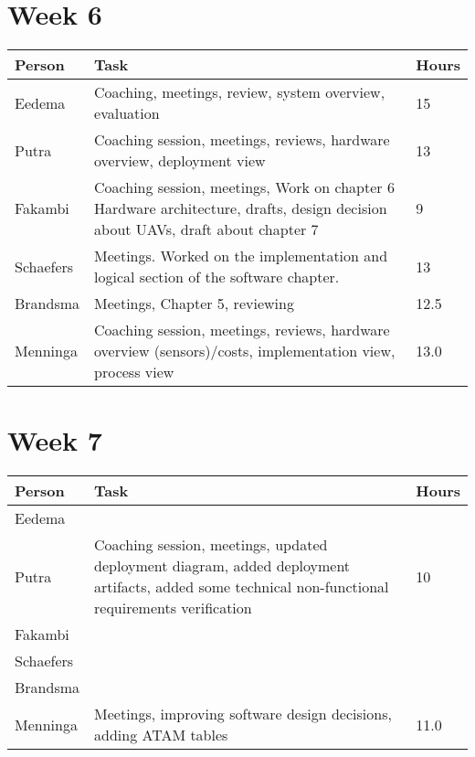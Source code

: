 \section{Week 6}
\begin{tabular}{p{} p{} p{}}
	\textbf{Person} & \textbf{Task}                                                                                                                  & \textbf{Hours} \\ \midrule
	Eedema          & Coaching, meetings, review, system overview, evaluation                                                                        & 15             \\ \midrule
	Putra           & Coaching session, meetings, reviews, hardware overview, deployment view                                                        & 13             \\ \midrule
	Fakambi         & Coaching session, meetings, Work on chapter 6 Hardware architecture, drafts, design decision about UAVs, draft about chapter 7 & 9              \\ \midrule
	Schaefers       & Meetings. Worked on the implementation and logical section of the software chapter.                                            & 13             \\ \midrule
	Brandsma        & Meetings, Chapter 5, reviewing                                                                                                 & 12.5           \\ \midrule
	Menninga        & Coaching session, meetings, reviews, hardware overview (sensors)/costs, implementation view, process view                      & 13.0           \\
	\midrule
\end{tabular}

\section{Week 7}
\begin{tabular}{p{} p{} p{}}
	\textbf{Person} & \textbf{Task}                                                                                                                  & \textbf{Hours} \\ \midrule
	Eedema          & & \\ \midrule
	Putra           & Coaching session, meetings, updated deployment diagram, added deployment artifacts, added some technical non-functional requirements verification & 10 \\ \midrule
	Fakambi         & & \\ \midrule
	Schaefers       & & \\ \midrule
	Brandsma        & & \\ \midrule
	Menninga        & Meetings, improving software design decisions, adding ATAM tables                      &  11.0    \\
	\midrule
\end{tabular}